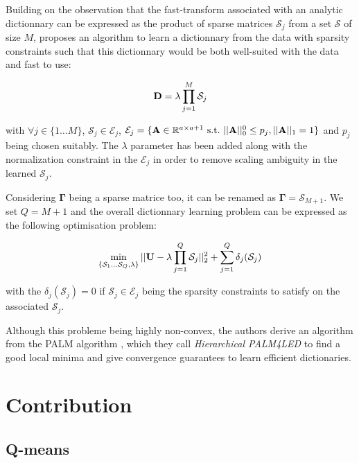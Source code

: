 \documentclass{article}
\def\rmGamma{{\mathbf{\Gamma}}}
\begin{document}
Building on the observation that the fast-transform associated with an analytic dictionnary can be expressed as the product of sparse matrices $\mathcal{S}_j$ from a set $\mathcal{S}$ of size $M$, \cite{magoarou2014learning} proposes an algorithm to learn a dictionnary from the data with sparsity constraints such that this dictionnary would be both well-suited with the data and fast to use:

\begin{equation}
{\mathbf{D}} = \lambda \prod_{j=1}^{M}\mathcal{S}_j
\end{equation}

with $\forall j \in \{1 \ldots M\}$, $\mathcal{S}_j \in \mathcal{E}_j$, $\mathcal{E}_j = \lbrace {\mathbf{A}} \in \mathbb{R}^{a \times a+1}~\text{s.t.}~||{\mathbf{A}}||_0^0 \leq p_j, ||{\mathbf{A}}||_1 = 1 \rbrace$ and $p_j$ being chosen suitably. The $\lambda$ parameter has been added along with the normalization constraint in the $\mathcal{E}_j$ in order to remove scaling ambiguity in the learned $\mathcal{S}_j$.

Considering $\rmGamma$ being a sparse matrice too, it can be renamed as $\rmGamma = \mathcal{S}_{M+1}$. We set $Q = M+1$ and the overall dictionnary learning problem can be expressed as the following optimisation problem:

\begin{equation}
\label{eq:problem_gribon}
\min_{\{\mathcal{S}_1 \dots \mathcal{S}_Q, \lambda\}} ||{\mathbf{U}} - \lambda \prod_{j=1}^{Q}{\mathcal{S}_j}||_2^2 + \sum_{j=1}^{Q} \delta_j(\mathcal{S}_j)
\end{equation}

with the $\delta_j(\mathcal{S}_j) = 0$ if $\mathcal{S}_j \in \mathcal{E}_j$ being the sparsity constraints to satisfy on the associated $\mathcal{S}_j$.

Although this probleme being highly non-convex, the authors derive an algorithm from the PALM algorithm \cite{bolte2014proximal}, which they call \textit{Hierarchical PALM4LED} to find a good local minima and give convergence guarantees to learn efficient dictionaries.


\section{Contribution}

\subsection{Q-means}
\end{document}

